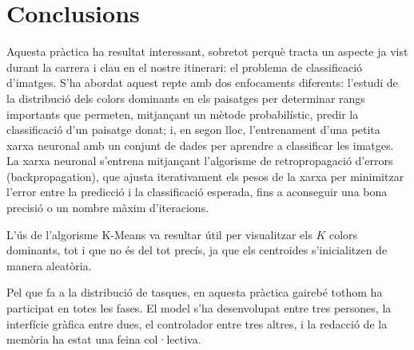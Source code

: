 \documentclass{ieeetj}
\begin{document}
\section{Conclusions} 
Aquesta pràctica ha resultat interessant, sobretot perquè tracta un aspecte ja vist durant la carrera i clau en el nostre itinerari: el problema de classificació d’imatges.  
S’ha abordat aquest repte amb dos enfocaments diferents: l’estudi de la distribució dels colors dominants en els paisatges per determinar rangs importants que permeten, mitjançant un mètode probabilístic, predir la classificació d’un paisatge donat; i, en segon lloc, l’entrenament d’una petita xarxa neuronal amb un conjunt de dades per aprendre a classificar les imatges.  
La xarxa neuronal s’entrena mitjançant l’algorisme de retropropagació d’errors (backpropagation), que ajusta iterativament els pesos de la xarxa per minimitzar l’error entre la predicció i la classificació esperada, fins a aconseguir una bona precisió o un nombre màxim d’iteracions.\newline

L'ús de l'algorisme K-Means va resultar útil per visualitzar els \(K\) colors dominants, tot i que no és del tot precís, ja que els centroides s'inicialitzen de manera aleatòria. \newline

Pel que fa a la distribució de tasques, en aquesta pràctica gairebé tothom ha participat en totes les fases. El model s'ha desenvolupat entre tres persones, la interfície gràfica entre dues, el controlador entre tres altres, i la redacció de la memòria ha estat una feina col·lectiva.
\end{document}
